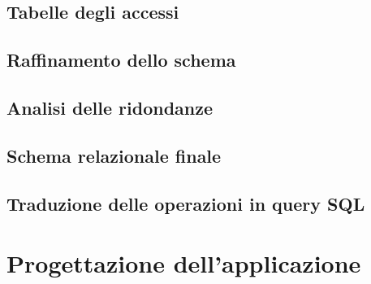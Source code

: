 \documentclass[a4paper,12pt]{report}
\begin{document}
\section{Tabelle degli accessi}
\section{Raffinamento dello schema}
\section{Analisi delle ridondanze}
\section{Schema relazionale finale}
\section{Traduzione delle operazioni in query SQL}

\chapter{Progettazione dell'applicazione}
\end{document}
